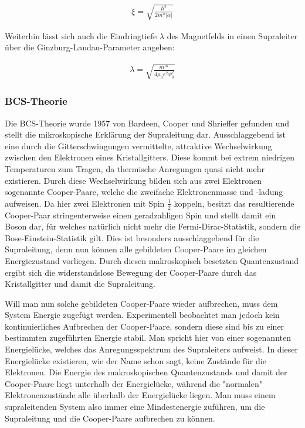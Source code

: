 \begin{align}
\xi= \sqrt{\frac{\hslash^2}{2m*\vert\alpha\vert}}
\end{align}

Weiterhin lässt sich auch die Eindringtiefe $\lambda$ des Magnetfelds in einen Supraleiter über die Ginzburg-Landau-Parameter angeben:

\begin{align}
\lambda=\sqrt{\frac{m*}{4\mu_0e^2\psi_0^2}}
\end{align}


\subsubsection{BCS-Theorie}

Die BCS-Theorie wurde 1957 von Bardeen, Cooper und Shrieffer gefunden und stellt die mikroskopische Erklärung der Supraleitung dar. Ausschlaggebend ist eine durch die Gitterschwingungen vermittelte, attraktive Wechselwirkung zwischen den Elektronen eines Kristallgitters. Diese kommt bei extrem niedrigen Temperaturen zum Tragen, da thermische Anregungen quasi nicht mehr existieren. Durch diese Wechselwirkung bilden sich aus zwei Elektronen sogenannte Cooper-Paare, welche die zweifache Elektronenmasse und -ladung aufweisen. Da hier zwei Elektronen mit Spin $\frac{1}{2}$ koppeln, besitzt das resultierende Cooper-Paar stringenterweise einen geradzahligen Spin und stellt damit ein Boson dar, für welches natürlich nicht mehr die Fermi-Dirac-Statistik, sondern die Bose-Einstein-Statistik gilt. Dies ist besonders ausschlaggebend für die Supraleitung, denn nun können alle gebildeten Cooper-Paare im gleichen Energiezustand vorliegen. Durch diesen makroskopisch besetzten Quantenzustand ergibt sich die widerstandslose Bewegung der Cooper-Paare durch das Kristallgitter und damit die Supraleitung. 

Will man nun solche gebildeten Cooper-Paare wieder aufbrechen, muss dem System Energie zugefügt werden. Experimentell beobachtet man jedoch kein kontinuierliches Aufbrechen der Cooper-Paare, sondern diese sind bis zu einer bestimmten zugeführten Energie stabil. Man spricht hier von einer sogenannten Energielücke, welches das Anregungsspektrum des Supraleiters aufweist. In dieser Energielücke existieren, wie der Name schon sagt, keine Zustände für die Elektronen. Die Energie des makroskopischen Quantenzustands und damit der Cooper-Paare liegt unterhalb der Energielücke, während die "normalen" Elektronenzustände alle überhalb der Energielücke liegen. Man muss einem supraleitenden System also immer eine Mindestenergie zuführen, um die Supraleitung und die Cooper-Paare aufbrechen zu können.



